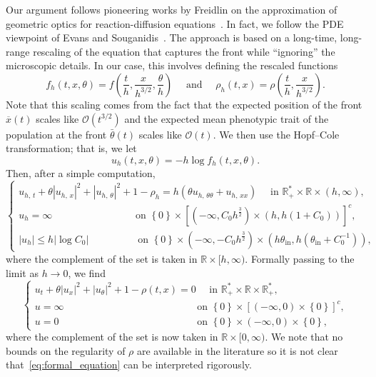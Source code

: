 \documentclass[AHL,Unicode,longabstracts]{cedram}
\newcommand{\rmin}{\mathrm{in}}
\newcommand{\R}{\mathbb{R}}
\newcommand{\mO}{\mathcal{O}}
\newcommand{\1}{\mathds{1}}
\begin{document}
Our argument follows pioneering works by Freidlin on the approximation of geometric optics for reaction-diffusion equations~\cite{Freidlin2,freidlin_geometric_1986}. In fact, we follow the PDE viewpoint of Evans and Souganidis~\cite{EvansSouganidis}. The approach is based on a long-time, long-range rescaling of the equation that captures the front while ``ignoring'' the microscopic details. In our case, this involves defining the rescaled functions
\[
f_h(t,x,\theta) = f\left(\frac{t}{h},\frac{x}{h^{3/2}},\frac{\theta}{h}\right) \quad \text{ and } \quad
\rho_h(t,x) = \rho\left(\frac{t}{h},\frac{x}{h^{3/2}}\right).
\]
Note that this scaling comes from the fact that the expected position of the front $\overline x(t)$ scales like $\mO(t^{3/2})$ and the expected mean phenotypic trait of the population at the front $\bar \theta(t)$ scales like $\mO(t)$. We then use the Hopf--Cole transformation; that is, we let
\begin{equation}\label{eq:u_h}
u_h(t,x,\theta) = - h\log f_h(t,x,\theta).
\end{equation}
Then, after a simple computation,
\begin{equation*}
\begin{cases}
u_{h,\,t} +\theta | u_{h,\,x}|^2+|u_{h,\,\theta}|^2+1-\rho_h=h \left(\theta u_{h,\,\theta\theta} + u_{h,\,xx}\right) \quad \text{ in } \R_+^* \times \R \times (h,\infty),\\[0.10em]
u_h=\infty \hspace{96pt} \text{ on } \left\{0\right\} \times \left[\left(-\infty, C_0 h^\frac32\right) \times \left(h, h (1 + C_0)\right)\right]^c,\\[0.14em]
|u_h|\leq h |\log C_0| \hspace{55pt} \text{ on } \left\{0\right\}\times \left(-\infty,-C_0h^\frac32\right)\times \left(h \theta_{\rmin}, h\left(\theta_{\rmin}+C_0^{-1}\right)\right),
\end{cases}
\end{equation*}
where the complement of the set is taken in $\R\times[h,\infty)$. Formally passing to the limit as $h\to 0$, we find
\begin{equation}\label{eq:formal_equation}
\begin{cases}
u_t+ \theta| u_{x}|^2+|u_{\theta}|^2+1-\rho(t,x) =0 \quad\text{ in } \R_+^* \times \R \times \R_+^*,\\
u=\infty \hspace{156pt} \text{ on } \left\{0\right\}\times [(-\infty,0)\times\left\{0\right\}]^c,\\%
u= 0 \hspace{162pt} \text{ on } \left\{0\right\} \times (-\infty,0)\times \left\{0\right\},
\end{cases}
\end{equation}
where the complement of the set is now taken in $\R\times[0,\infty)$. We note that no bounds on the regularity of $\rho$ are available in the literature so it is not clear that~\eqref{eq:formal_equation} can be interpreted rigorously.
\end{document}
